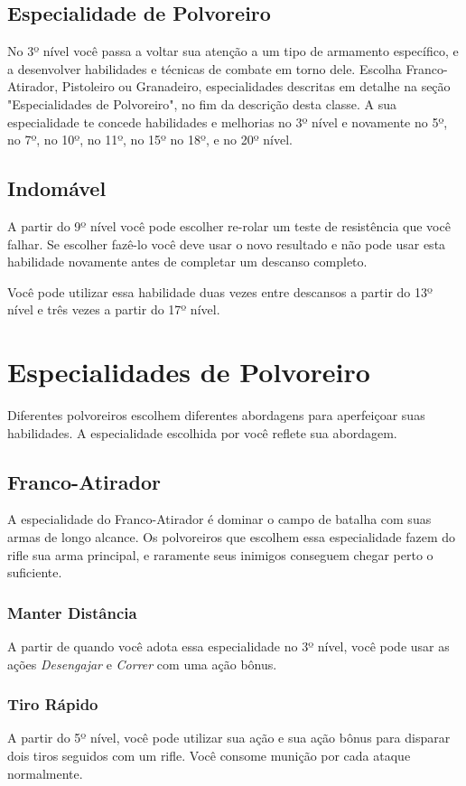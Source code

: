 \documentclass[letterpaper,twocolumn,openany]{dndbook}
\begin{document}
	\subsection{Especialidade de Polvoreiro}
	No 3º nível você passa a voltar sua atenção a um tipo de armamento específico, e a desenvolver habilidades e técnicas de combate em torno dele. Escolha Franco-Atirador, Pistoleiro ou Granadeiro, especialidades descritas em detalhe na seção "Especialidades de Polvoreiro", no fim da descrição desta classe. A sua especialidade te concede habilidades e melhorias no 3º nível e novamente no 5º, no 7º, no 10º, no 11º, no 15º no 18º, e no 20º nível.
	
	\subsection{Indomável}
	A partir do 9º nível você pode escolher re-rolar um teste de resistência que você falhar. Se escolher fazê-lo você deve usar o novo resultado e não pode usar esta habilidade novamente antes de completar um descanso completo.
	\par Você pode utilizar essa habilidade duas vezes entre descansos a partir do 13º nível e três vezes a partir do 17º nível.
	
	\section{Especialidades de Polvoreiro}
	Diferentes polvoreiros escolhem diferentes abordagens para aperfeiçoar suas habilidades. A especialidade escolhida por você reflete sua abordagem.
	
	\subsection{Franco-Atirador}
	A especialidade do Franco-Atirador é dominar o campo de batalha com suas armas de longo alcance. Os polvoreiros que escolhem essa especialidade fazem do rifle sua arma principal, e raramente seus inimigos conseguem chegar perto o suficiente.
	
	\subsubsection{Manter Distância}
	A partir de quando você adota essa especialidade no 3º nível, você pode usar as ações \textit{Desengajar} e \textit{Correr} com uma ação bônus.
	
	\subsubsection{Tiro Rápido}
	A partir do 5º nível, você pode utilizar sua ação e sua ação bônus para disparar dois tiros seguidos com um rifle. Você consome munição por cada ataque normalmente.
	
\end{document}
